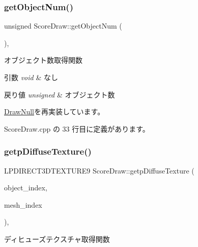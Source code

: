 \subsubsection{\texorpdfstring{get\+Object\+Num()}{getObjectNum()}}
{\footnotesize\ttfamily unsigned Score\+Draw\+::get\+Object\+Num (\begin{DoxyParamCaption}{ }\end{DoxyParamCaption})\hspace{0.3cm}{\ttfamily [override]}, {\ttfamily [virtual]}}



オブジェクト数取得関数 


\begin{DoxyParams}{引数}
{\em void} & なし \\
\hline
\end{DoxyParams}

\begin{DoxyRetVals}{戻り値}
{\em unsigned} & オブジェクト数 \\
\hline
\end{DoxyRetVals}


\mbox{\hyperlink{class_draw_null_a8bddfa6ee87e47b2ecbbe6803b088e37}{Draw\+Null}}を再実装しています。



 Score\+Draw.\+cpp の 33 行目に定義があります。

\mbox{\label{class_score_draw_a8736a0044e8a2a6258c396bfed4d1ce8}} 
\subsubsection{\texorpdfstring{getp\+Diffuse\+Texture()}{getpDiffuseTexture()}}
{\footnotesize\ttfamily L\+P\+D\+I\+R\+E\+C\+T3\+D\+T\+E\+X\+T\+U\+R\+E9 Score\+Draw\+::getp\+Diffuse\+Texture (\begin{DoxyParamCaption}\item[{unsigned}]{object\+\_\+index,  }\item[{unsigned}]{mesh\+\_\+index }\end{DoxyParamCaption})\hspace{0.3cm}{\ttfamily [override]}, {\ttfamily [virtual]}}



ディヒューズテクスチャ取得関数 


